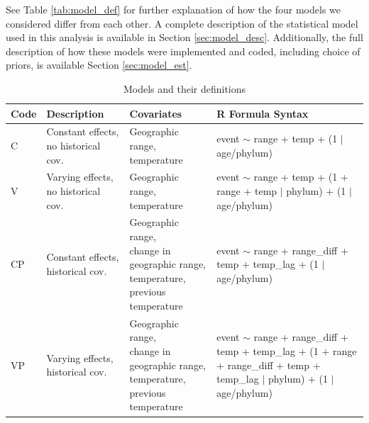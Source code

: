 \documentclass[12pt,letterpaper]{article}
\begin{document}
\begin{refsection}
See Table \ref{tab:model_def} for further explanation of how the four models we considered differ from each other. A complete description of the statistical model used in this analysis is available in Section \ref{sec:model_desc}. Additionally, the full description of how these models were implemented and coded, including choice of priors, is available Section \ref{sec:model_est}.


\begin{table}[ht]
 \caption{Models and their definitions}
 \begin{threeparttable}
  {
   \def\arraystretch{1.5}
   \begin{tabular}{ l p{3cm} l l }
    Code & Description & Covariates & R Formula Syntax\tnote{a}\phantom{\textsuperscript{a}} \\
    \hline
    C & Constant effects, no historical cov. & \parbox[t]{0.25\textwidth}{Geographic range,\\temperature} & \parbox[t]{0.33\textwidth}{event $\sim$ range + temp +\\(1 $|$ age/phylum)} \\
    V & Varying effects, no historical cov. & \parbox[t]{0.25\textwidth}{Geographic range,\\temperature} & \parbox[t]{0.33\textwidth}{event $\sim$ range + temp +\\(1 + range + temp $|$ phylum) + (1 $|$ age/phylum)} \\ 
    CP & Constant effects, historical cov. & \parbox[t]{0.25\textwidth}{Geographic range,\\change in geographic range, temperature,\\previous temperature} & \parbox[t]{0.33\textwidth}{event $\sim$ range + range\_diff +\\temp + temp\_lag +\\(1 $|$ age/phylum)} \\
    VP & Varying effects, historical cov. & \parbox[t]{0.25\textwidth}{Geographic range,\\change in geographic range, temperature,\\previous temperature} & \parbox[t]{0.33\textwidth}{event $\sim$ range + range\_diff +\\temp + temp\_lag +\\(1 + range + range\_diff +\\temp + temp\_lag $|$ phylum) +\\(1 $|$ age/phylum)} \\

\end{tabular}}
\end{threeparttable}
\end{table}
\end{refsection}
\end{document}
